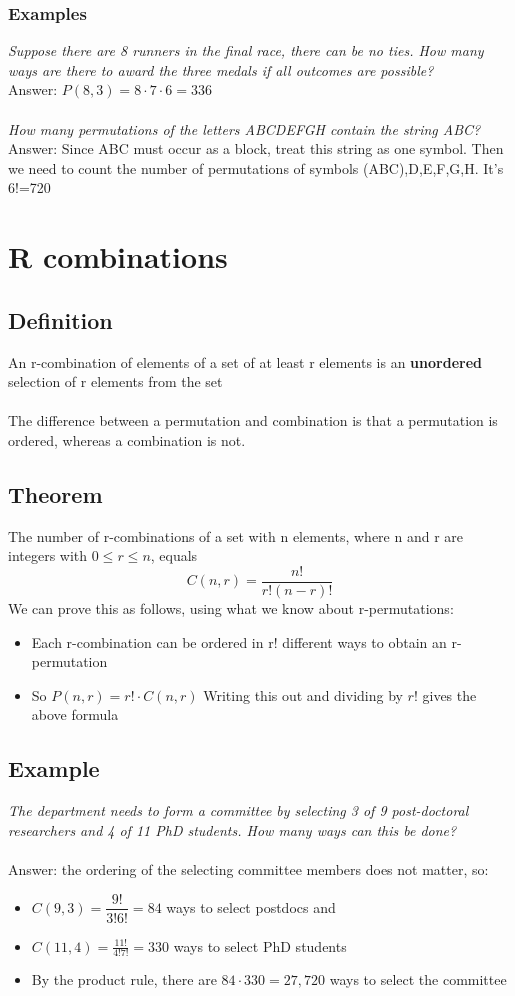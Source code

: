 \documentclass{article}[18pt]
\begin{document}
\subsubsection{Examples}
\textit{Suppose there are 8 runners in the final race, there can be no ties. How many ways are there to award the three medals if all outcomes are possible?}\\
Answer: $P(8,3)=8\cdot7\cdot6=336$\\
\\
\textit{How many permutations of the letters ABCDEFGH contain the string ABC?}\\
Answer: Since ABC must occur as a block, treat this string as one symbol. Then we need to count the number of permutations of symbols (ABC),D,E,F,G,H. It's 6!=720
\section{R combinations}
\subsection{Definition}
An r-combination of elements of a set of at least r elements is an \textbf{unordered} selection of r elements from the set\\
\\
The difference between a permutation and combination is that a permutation is ordered, whereas a combination is not.
\subsection{Theorem}
The number of r-combinations of a set with n elements, where n and r are integers with $0\leqslant r\leqslant n$, equals
$$C(n,r)=\frac{n!}{r!(n-r)!}$$
We can prove this as follows, using what we know about r-permutations:
\begin{itemize}
\item Each r-combination can be ordered in r! different ways to obtain an r-permutation
\item So $P(n,r)=r!\cdot C(n,r)$ Writing this out and dividing by $r!$ gives the above formula
\end{itemize}
\subsection{Example}
\textit{The department needs to form a committee by selecting 3 of 9 post-doctoral researchers and 4 of 11 PhD students. How many ways can this be done?}\\
\\
Answer: the ordering of the selecting committee members does not matter, so:
\begin{itemize}
\item $C(9,3)=\dfrac{9!}{3!6!}=84$ ways to select postdocs and
\item $C(11,4)=\frac{11!}{4!7!}=330$ ways to select PhD students
\item By the product rule, there are $84\cdot330=27,720$ ways to select the committee
\end{itemize}
\end{document}
